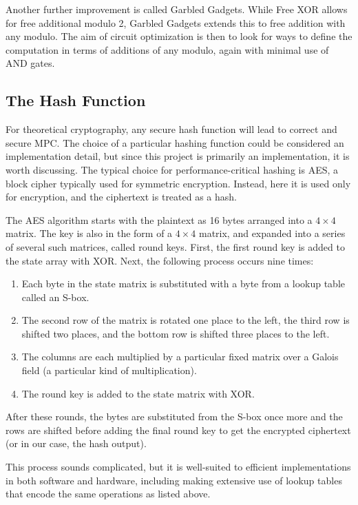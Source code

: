 Another further improvement is called Garbled Gadgets. While Free XOR allows for free additional modulo 2, Garbled Gadgets extends this to free addition with any modulo\cite{gentle}. The aim of circuit optimization is then to look for ways to define the computation in terms of additions of any modulo, again with minimal use of AND gates.

\subsection{The Hash Function}
For theoretical cryptography, any secure hash function will lead to correct and secure MPC. The choice of a particular hashing function could be considered an implementation detail, but since this project is primarily an implementation, it is worth discussing. The typical choice for performance-critical hashing is AES, a block cipher typically used for symmetric encryption. Instead, here it is used only for encryption, and the ciphertext is treated as a hash.

The AES algorithm starts with the plaintext as 16 bytes arranged into a $4\times4$ matrix. The key is also in the form of a $4\times4$ matrix, and expanded into a series of several such matrices, called round keys. First, the first round key is added to the state array with XOR. Next, the following process occurs nine times:

\begin{enumerate}
	\item Each byte in the state matrix is substituted with a byte from a lookup table called an S-box.
	\item The second row of the matrix is rotated one place to the left, the third row is shifted two places, and the bottom row is shifted three places to the left.
	\item The columns are each multiplied by a particular fixed matrix over a Galois field (a particular kind of multiplication).
	\item The round key is added to the state matrix with XOR.
\end{enumerate}

After these rounds, the bytes are substituted from the S-box once more and the rows are shifted before adding the final round key to get the encrypted ciphertext (or in our case, the hash output).

This process sounds complicated, but it is well-suited to efficient implementations in both software and hardware, including making extensive use of lookup tables that encode the same operations as listed above.

